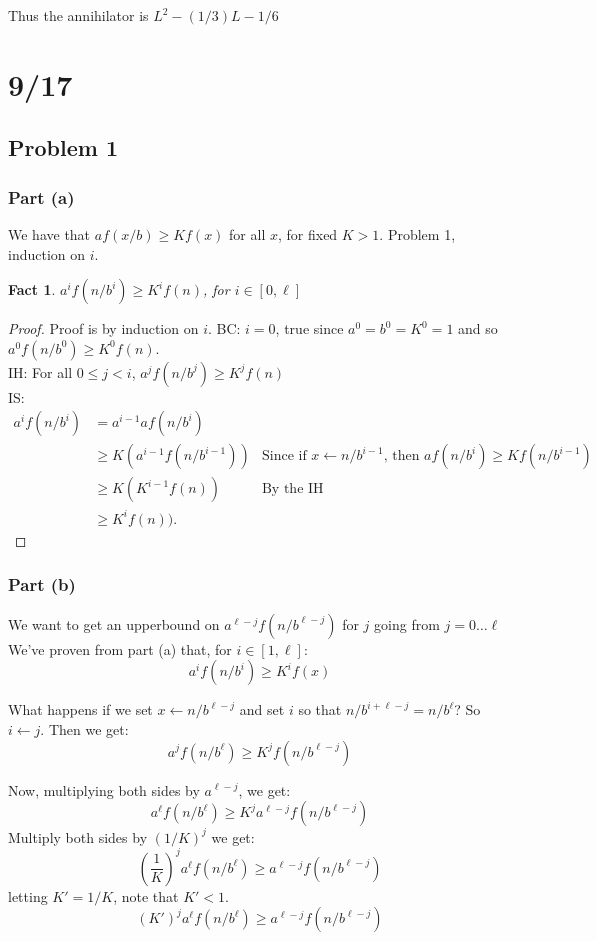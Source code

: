 \documentclass{article}
\newtheorem{fact}{Fact}
\begin{document}
Thus the annihilator is 
$L^2 - (1/3)L - 1/6$


\section{9/17}

\subsection{Problem 1}

\subsubsection{Part (a)}
We have that $af(x/b) \geq K f(x)$ for all $x$, for fixed $K > 1$.
Problem 1, induction on $i$.
\begin{fact}
    $a^{i} f(n/b^{i}) \geq K^i f(n)$, for $i \in [0,\ell]$
\end{fact}


\begin{proof}
Proof is by induction on $i$.
    BC: $i = 0$, true since $a^0 = b^0 = K^0 = 1$ and so $a^0f(n/b^0) \geq K^0 f(n)$.\\
    IH: For all $0 \leq j<i$, $a^jf(n/b^j) \geq K^j f(n)$\\
    IS: 
    \begin{align*}
        a^{i} f(n/b^{i}) & = a^{i-1} a f(n/b^{i})\\
        & \geq K (a^{i-1} f(n/b^{i-1})) & \text{Since if $x \leftarrow n/b^{i-1}$, then $a f(n/b^i) \geq K f(n/b^{i-1})$}\\
        & \geq K (K^{i-1} f(n)) & \text{By the IH}\\
        & \geq K^i f(n)).
    \end{align*}
\end{proof}

\subsubsection{Part (b)}
We want to get an upperbound on $a^{\ell -j} f(n/b^{\ell -j})$ for $j$ going from $j = 0 \ldots \ell$ 
We've proven from part (a) that, for $i \in [1,\ell]$:
$$a^{i} f(n/b^{i}) \geq K^i f(x)$$

What happens if we set $x \leftarrow n/b^{\ell - j}$ and set $i$ so that $n/b^{i+\ell -j} = n/b^{\ell}$?  So $i \leftarrow j$.  Then we get:
$$a^{j} f(n/b^{\ell}) \geq K^j f(n/b^{\ell-j})$$

Now, multiplying both sides by $a^{\ell-j}$, we get:
$$a^{\ell} f(n/b^{\ell}) \geq K^j a^{\ell-j} f(n/b^{\ell-j})$$
Multiply both sides by $(1/K)^j$ we get:
$$\left(\frac{1}{K} \right)^j a^{\ell} f(n/b^{\ell}) \geq a^{\ell-j} f(n/b^{\ell-j})$$
letting $K' = 1/K$, note that $K'<1$.
$$(K')^j a^{\ell} f(n/b^{\ell}) \geq a^{\ell-j} f(n/b^{\ell-j})$$
\end{document}
